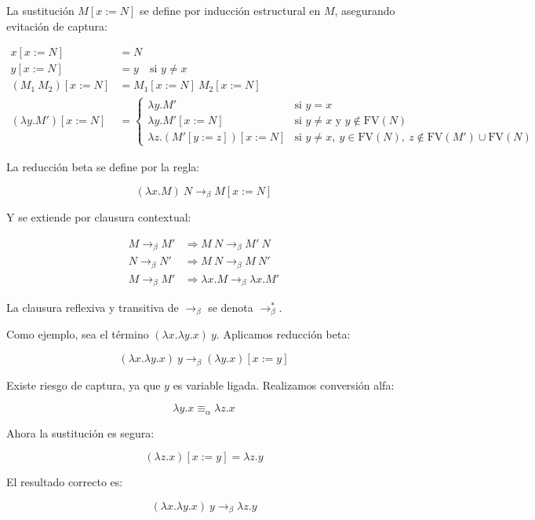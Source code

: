 \documentclass[12pt]{book}
\theoremstyle{plain}
\theoremstyle{definition}
\theoremstyle{definition}
\theoremstyle{definition}
\begin{document}
La sustitución \( M[x := N] \) se define por inducción estructural en \( M \), asegurando evitación de captura:

\begin{align*}
x[x := N] &= N \\
y[x := N] &= y \quad \text{si } y \neq x \\
(M_1\ M_2)[x := N] &= M_1[x := N]\ M_2[x := N] \\
(\lambda y. M')[x := N] &=
\begin{cases}
\lambda y. M' & \text{si } y = x \\
\lambda y. M'[x := N] & \text{si } y \neq x \text{ y } y \notin \mathrm{FV}(N) \\
\lambda z. (M'[y := z])[x := N] & \text{si } y \neq x,\ y \in \mathrm{FV}(N),\ z \notin \mathrm{FV}(M') \cup \mathrm{FV}(N)
\end{cases}
\end{align*}

La reducción beta se define por la regla:

\[
(\lambda x. M)\ N \rightarrow_\beta M[x := N]
\]

Y se extiende por clausura contextual:

\begin{align*}
M \rightarrow_\beta M' &\Rightarrow M\ N \rightarrow_\beta M'\ N \\
N \rightarrow_\beta N' &\Rightarrow M\ N \rightarrow_\beta M\ N' \\
M \rightarrow_\beta M' &\Rightarrow \lambda x. M \rightarrow_\beta \lambda x. M'
\end{align*}

La clausura reflexiva y transitiva de \( \rightarrow_\beta \) se denota \( \rightarrow_\beta^* \).

Como ejemplo, sea el término \( (\lambda x. \lambda y. x)\ y \). Aplicamos reducción beta:

\[
(\lambda x. \lambda y. x)\ y \rightarrow_\beta (\lambda y. x)[x := y]
\]

Existe riesgo de captura, ya que \( y \) es variable ligada. Realizamos conversión alfa:

\[
\lambda y. x \equiv_\alpha \lambda z. x
\]

Ahora la sustitución es segura:

\[
(\lambda z. x)[x := y] = \lambda z. y
\]

El resultado correcto es:

\[
(\lambda x. \lambda y. x)\ y \rightarrow_\beta \lambda z. y
\]
\end{document}
